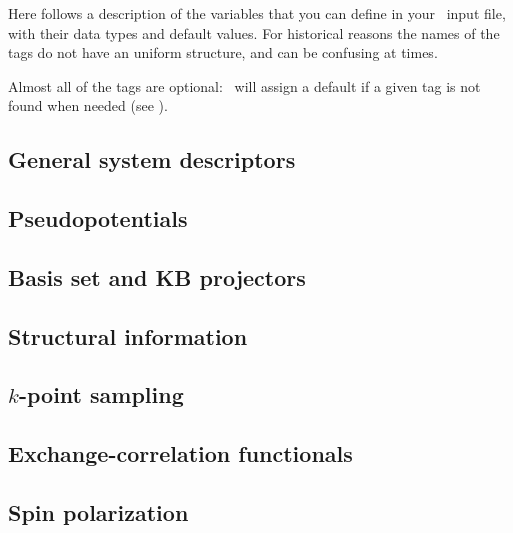 Here follows a description of the variables that you can define in
your \siesta\ input file, with their data types and default
values. For historical reasons the names of the tags do not have an
uniform structure, and can be confusing at times.

Almost all of the tags are optional: \siesta\ will assign a
default if a given tag is not found when needed (see ).

\subsection{General system descriptors}



\subsection{Pseudopotentials}
\label{ps-handling}



\subsection{Basis set and KB projectors}



\subsection{Structural information}



\subsection{\texorpdfstring{$k$}{k}-point sampling}
\label{ssec:k-points}



\subsection{Exchange-correlation functionals}



\subsection{Spin polarization}

